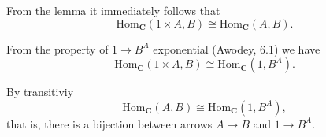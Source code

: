 \documentclass[12pt]{article}
\theoremstyle{definition}
\begin{document}
\begin{enumerate}
    From the lemma it immediately follows that $$\mathrm{Hom}_{\mathbf{C}}(1 \times A, B) \cong \mathrm{Hom}_{\mathbf{C}}(A, B).$$

    From the property of $1 \to B^A$ exponential (Awodey, 6.1) we have $$\mathrm{Hom}_{\mathbf{C}}(1 \times A, B) \cong \mathrm{Hom}_{\mathbf{C}}(1, B^A).$$

    By transitiviy $$\mathrm{Hom}_{\mathbf{C}}(A, B) \cong \mathrm{Hom}_{\mathbf{C}}(1, B^A),$$ that is, there is a bijection between arrows $A \to B$ and $1 \to B^A$.

\end{enumerate}
\end{document}
